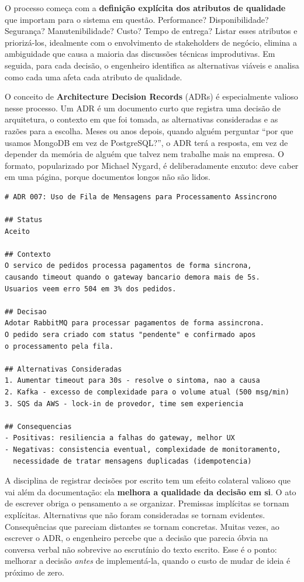 O processo começa com a \textbf{definição explícita dos atributos de
qualidade} que importam para o sistema em questão. Performance?
Disponibilidade? Segurança? Manutenibilidade? Custo? Tempo de entrega?
Listar esses atributos e priorizá-los, idealmente com o envolvimento
de stakeholders de negócio, elimina a ambiguidade que causa a maioria
das discussões técnicas improdutivas. Em seguida, para cada decisão, o
engenheiro identifica as alternativas viáveis e analisa como cada uma
afeta cada atributo de qualidade.

O conceito de \textbf{Architecture Decision Records} (ADRs) é
especialmente valioso nesse processo. Um ADR é um documento curto que
registra uma decisão de arquitetura, o contexto em que foi tomada, as
alternativas consideradas e as razões para a escolha. Meses ou anos
depois, quando alguém perguntar ``por que usamos MongoDB em vez de
PostgreSQL?'', o ADR terá a resposta, em vez de depender da memória
de alguém que talvez nem trabalhe mais na empresa. O formato, popularizado
por Michael Nygard, é deliberadamente enxuto: deve caber em uma página,
porque documentos longos não são lidos.

\begin{lstlisting}[language={}, caption={Exemplo de Architecture Decision Record (ADR)}]
# ADR 007: Uso de Fila de Mensagens para Processamento Assincrono

## Status
Aceito

## Contexto
O servico de pedidos processa pagamentos de forma sincrona,
causando timeout quando o gateway bancario demora mais de 5s.
Usuarios veem erro 504 em 3% dos pedidos.

## Decisao
Adotar RabbitMQ para processar pagamentos de forma assincrona.
O pedido sera criado com status "pendente" e confirmado apos
o processamento pela fila.

## Alternativas Consideradas
1. Aumentar timeout para 30s - resolve o sintoma, nao a causa
2. Kafka - excesso de complexidade para o volume atual (500 msg/min)
3. SQS da AWS - lock-in de provedor, time sem experiencia

## Consequencias
- Positivas: resiliencia a falhas do gateway, melhor UX
- Negativas: consistencia eventual, complexidade de monitoramento,
  necessidade de tratar mensagens duplicadas (idempotencia)
\end{lstlisting}

A disciplina de registrar decisões por escrito tem um efeito colateral
valioso que vai além da documentação: ela \textbf{melhora a qualidade da
decisão em si}. O ato de escrever obriga o pensamento a se organizar.
Premissas implícitas se tornam explícitas. Alternativas que não foram
consideradas se tornam evidentes. Consequências que pareciam distantes se
tornam concretas. Muitas vezes, ao escrever o ADR, o engenheiro percebe
que a decisão que parecia óbvia na conversa verbal não sobrevive ao
escrutínio do texto escrito. Esse é o ponto: melhorar a
decisão \emph{antes} de implementá-la, quando o custo de mudar de ideia
é próximo de zero.

